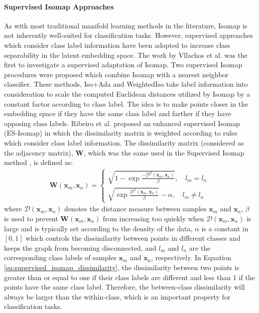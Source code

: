 \paragraph{Supervised Isomap Approaches}
As with most traditional manifold learning methods in the literature, Isomap is not inherently well-suited for classification tasks.  However, supervised approaches which consider class label information have been adopted to increase class separability in the latent embedding space. The work by Vllachos et al. \citep{Vlachos2002NonlinearDRClassification} was the first to investigate a supervised adaptation of Isomap.  Two supervised Isomap procedures were proposed which combine Isomap with a nearest neighbor classifier. These methods, Iso+Ada and WeightedIso take label information into consideration to scale the computed Euclidean distances utilized by Isomap by a constant factor according to class label. The idea is to make points closer in the embedding space if they have the same class label and farther if they have opposing class labels. Ribeiro et al. \citep{Ribeiro2008SupervisedIsomap} proposed an enhanced supervised Isomap (ES-Isomap) in which the dissimilarity matrix is weighted according to rules which consider class label information.  The dissimilarity matrix (considered as the adjacency matrix), $\bm{W}$, which was the same used in the Supervised Isomap method \citep{Geng2005SupNonlinearDimRed}, is defined as:
\begin{align}
	\bm{W}(\bm{x}_{m},\bm{x}_{n}) = \begin{cases} \sqrt{1 - \exp{\frac{-\mathcal{D}^{2}(\bm{x}_{m},\bm{x}_{n})}{\beta}}}, \quad l_m = l_n \\  \sqrt{ \exp{\frac{\mathcal{D}^{2}(\bm{x}_{m},\bm{x}_{n})}{\beta}}} - \alpha, \quad l_m \neq l_n\end{cases}
	\label{eq:supervised_isomap_dissimilarity}
\end{align}
\noindent
where $\mathcal{D}(\bm{x}_{m},\bm{x}_{n})$ denotes the distance measure between samples $\bm{x}_{m}$ and $\bm{x}_{n}$, $\beta$ is used to prevent $\bm{W}(\bm{x}_{m},\bm{x}_{n})$ from increasing too quickly when $\mathcal{D}(\bm{x}_{m},\bm{x}_{n})$ is large and is typically set according to the density of the data, $\alpha$ is a constant in $[0,1]$ which controls the dissimilarity between points in different classes and keeps the graph from becoming disconnected, and $l_{m}$ and $l_{n}$ are the corresponding class labels of samples  $\bm{x}_{m}$ and $\bm{x}_{n}$, respectively.  In Equation \ref{eq:supervised_isomap_dissimilarity}, the dissimilarity between two points is greater than or equal to one if their class labels are different and less than 1 if the points have the same class label.  Therefore, the between-class dissimilarity will always be larger than the within-class, which is an important property for classification tasks.


